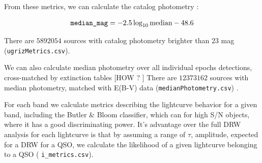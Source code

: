 \documentclass[fleqn,usenatbib]{mnras}  %
\begin{document}
From these metrics, we can calculate the catalog photometry  :

\begin{equation}
\verb|median_mag| = -2.5 \log_{10}\mbox{median} - 48.6
\end{equation}

There are  $5892054$ sources with catalog photometry brighter than $23$ mag  (\verb|ugrizMetrics.csv|). 

We can also calculate median photometry over all individual epochs  detections, cross-matched by extinction tables [HOW ? ]  There are $12373162$ sources with median photometry, matched with E(B-V) data (\verb|medianPhotometry.csv|) . 

For each band we calculate metrics describing the lightcurve behavior for a given band, including the Butler \& Bloom classifier, which can  for high S/N objects, where it has a good discriminating power. It's advantage over the full DRW analysis for each lightcurve is that by assuming a range of $\tau$, amplitude, expected for a DRW for a QSO, we calculate the likelihood of a given lightcurve belonging to a QSO ( \verb|i_metrics.csv|). 





%



\bsp	%
\label{lastpage}
\end{document}
